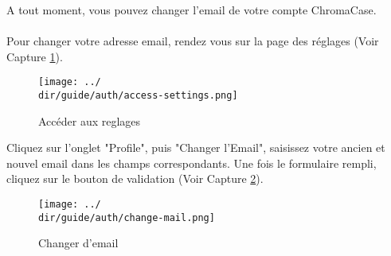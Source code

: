 A tout moment, vous pouvez changer l’email de votre compte ChromaCase.
\\\\
Pour changer votre adresse email, rendez vous sur la page des réglages (Voir Capture \ref{fig:access-settings}).

\begin{figure}[H]
	\texttt{[image: ../\\dir/guide/auth/access-settings.png]}
	\caption{Accéder aux reglages}
	\label{fig:access-settings}
\end{figure}

Cliquez sur l'onglet "Profile", puis "Changer l'Email", saisissez votre ancien et nouvel email dans les champs correspondants. Une fois le formulaire rempli, cliquez sur le bouton de validation (Voir Capture \ref{fig:change-mail}).

\begin{figure}[H]
	\texttt{[image: ../\\dir/guide/auth/change-mail.png]}
	\caption{Changer d'email}
	\label{fig:change-mail}
\end{figure}